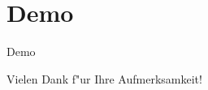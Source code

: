 \documentclass[landscape,compress,table]{beamer}
\begin{document}
\section{Demo}
\begin{frame}
	\begin{center}
		\Huge
		Demo
	\end{center}
\end{frame}

\begin{frame}
	\begin{center}
		\Large
		Vielen Dank f"ur Ihre Aufmerksamkeit!
	\end{center}
\end{frame}
\end{document}
